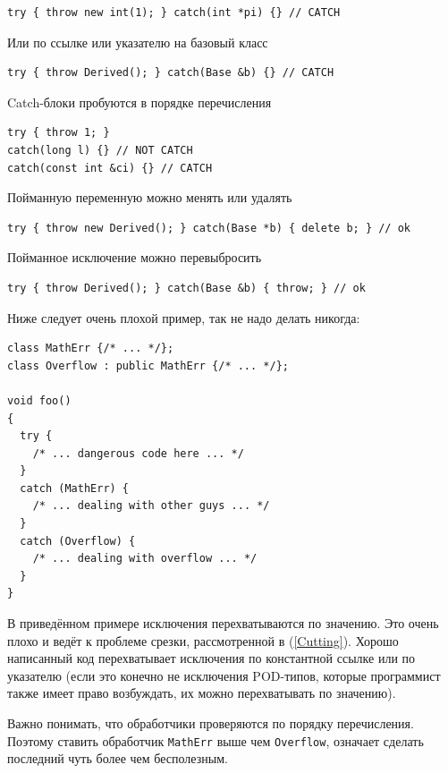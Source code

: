\documentclass[a4paper,12pt,oneside]{article}
\begin{document}
\begin{lstlisting}
try { throw new int(1); } catch(int *pi) {} // CATCH
\end{lstlisting}

Или по ссылке или указателю на базовый класс

\begin{lstlisting}
try { throw Derived(); } catch(Base &b) {} // CATCH
\end{lstlisting}

Catch-блоки пробуются в порядке перечисления

\begin{lstlisting}
try { throw 1; }
catch(long l) {} // NOT CATCH
catch(const int &ci) {} // CATCH
\end{lstlisting}

Пойманную переменную можно менять или удалять

\begin{lstlisting}
try { throw new Derived(); } catch(Base *b) { delete b; } // ok
\end{lstlisting}

Пойманное исключение можно перевыбросить

\begin{lstlisting}
try { throw Derived(); } catch(Base &b) { throw; } // ok
\end{lstlisting}

Ниже следует очень плохой пример, так не надо делать никогда:

\begin{lstlisting}
class MathErr {/* ... */};
class Overflow : public MathErr {/* ... */};

void foo()
{
  try {
    /* ... dangerous code here ... */
  }
  catch (MathErr) {
    /* ... dealing with other guys ... */
  }
  catch (Overflow) {
    /* ... dealing with overflow ... */
  }
}
\end{lstlisting}

В приведённом примере исключения перехватываются по значению. Это очень плохо и ведёт к проблеме срезки, рассмотренной в (\ref{Cutting}). Хорошо написанный код перехватывает исключения по константной ссылке или по указателю (если это конечно не исключения POD-типов, которые программист также имеет право возбуждать, их можно перехватывать по значению).

Важно понимать, что обработчики проверяются по порядку перечисления. Поэтому ставить обработчик \lstinline!MathErr! выше чем \lstinline!Overflow!, означает сделать последний чуть более чем бесполезным.
\end{document}
